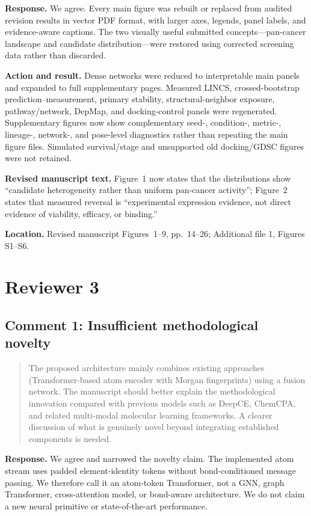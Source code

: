 \documentclass[10pt]{article}
\newenvironment{reviewcomment}{%
  \begin{quote}\small\itshape\color{black}
}{\end{quote}}
\newcommand{\Response}{\textbf{Response.} }
\newcommand{\Action}{\textbf{Action and result.} }
\newcommand{\RevisedText}{\textbf{Revised manuscript text.} }
\newcommand{\Location}{\textbf{Location.} }
\newcommand{\qtext}[1]{``#1''}
\begin{document}
\Response We agree. Every main figure was rebuilt or replaced from audited revision results in vector PDF format, with larger axes, legends, panel labels, and evidence-aware captions. The two visually useful submitted concepts---pan-cancer landscape and candidate distribution---were restored using corrected screening data rather than discarded.

\Action Dense networks were reduced to interpretable main panels and expanded to full supplementary pages. Measured LINCS, crossed-bootstrap prediction--measurement, primary stability, structural-neighbor exposure, pathway/network, DepMap, and docking-control panels were regenerated. Supplementary figures now show complementary seed-, condition-, metric-, lineage-, network-, and pose-level diagnostics rather than repeating the main figure files. Simulated survival/stage and unsupported old docking/GDSC figures were not retained.

\RevisedText Figure~1 now states that the distributions show \qtext{candidate heterogeneity rather than uniform pan-cancer activity}; Figure~2 states that measured reversal is \qtext{experimental expression evidence, not direct evidence of viability, efficacy, or binding.}

\Location Revised manuscript Figures~1--9, pp.~14--26; Additional file 1, Figures S1--S6.

\clearpage
\section*{Reviewer 3}

\subsection*{Comment 1: Insufficient methodological novelty}
\begin{reviewcomment}
The proposed architecture mainly combines existing approaches (Transformer-based atom encoder with Morgan fingerprints) using a fusion network. The manuscript should better explain the methodological innovation compared with previous models such as DeepCE, ChemCPA, and related multi-modal molecular learning frameworks. A clearer discussion of what is genuinely novel beyond integrating established components is needed.
\end{reviewcomment}

\Response We agree and narrowed the novelty claim. The implemented atom stream uses padded element-identity tokens without bond-conditioned message passing. We therefore call it an atom-token Transformer, not a GNN, graph Transformer, cross-attention model, or bond-aware architecture. We do not claim a new neural primitive or state-of-the-art performance.
\end{document}
